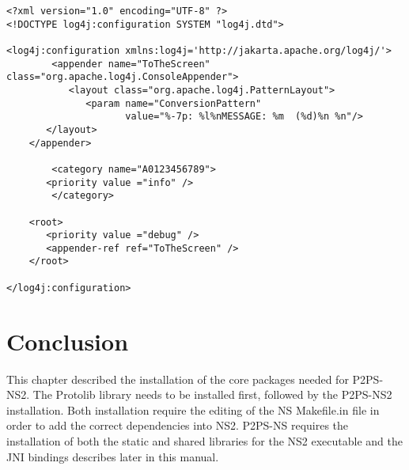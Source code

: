 \footnotesize
\begin{verbatim}
<?xml version="1.0" encoding="UTF-8" ?>
<!DOCTYPE log4j:configuration SYSTEM "log4j.dtd">

<log4j:configuration xmlns:log4j='http://jakarta.apache.org/log4j/'>
        <appender name="ToTheScreen" class="org.apache.log4j.ConsoleAppender">
           <layout class="org.apache.log4j.PatternLayout">
              <param name="ConversionPattern" 
                     value="%-7p: %l%nMESSAGE: %m  (%d)%n %n"/>
	   </layout>
	</appender>
 
        <category name="A0123456789">  	
	   <priority value ="info" />
        </category>  	

	<root>
	   <priority value ="debug" />
   	   <appender-ref ref="ToTheScreen" />
	</root>
	
</log4j:configuration> 
\end{verbatim}
\normalsize

\section{Conclusion}

This chapter described the installation of the core packages needed
for P2PS-NS2.  The Protolib library needs to be installed first, followed by
the P2PS-NS2 installation.  Both installation require the editing
of the NS Makefile.in file in order to add the correct dependencies into
NS2.  P2PS-NS requires the installation of both the static and shared
libraries for the NS2 executable and the JNI bindings describes later
in this manual.
 
 
 
